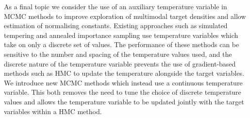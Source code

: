 As a final topic we consider the use of an auxiliary temperature variable in \ac{MCMC} methods to improve exploration of multimodal target densities and allow estimation of normalising constants. Existing approaches such as simulated tempering and annealed importance sampling use temperature variables which take on only a discrete set of values. The performance of these methods can be sensitive to the number and spacing of the temperature values used, and the discrete nature of the temperature variable prevents the use of gradient-based methods such as \ac{HMC} to update the temperature alongside the target variables. We introduce new \ac{MCMC} methods which instead use a continuous temperature variable. This both removes the need to tune the choice of discrete temperature values and allows the temperature variable to be updated jointly with the target variables within a \ac{HMC} method. 
